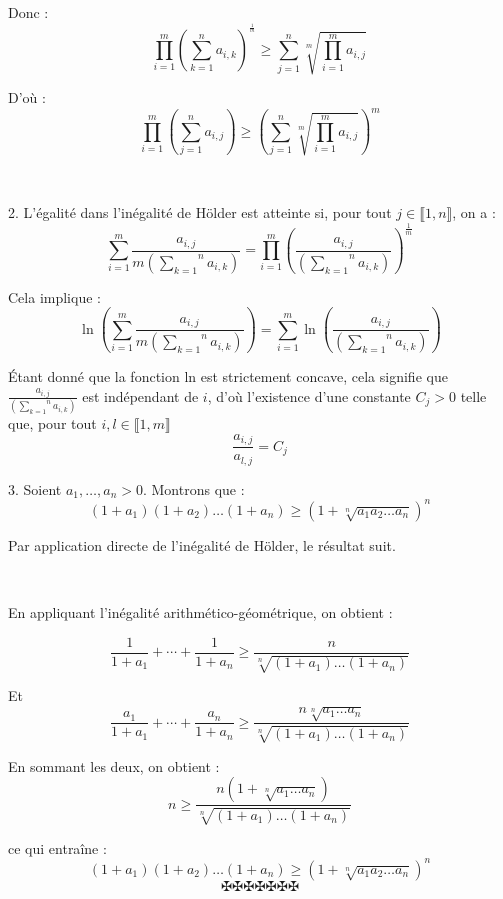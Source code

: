 Donc :
\[ \underset{i = 1}{\overset{}{} \overset{m}{\prod}} \left(
   \overset{n}{\underset{k = 1}{\sum}} a_{i, k} \right)^{^{\frac{1}{m}}}
   \geqslant \underset{j = 1}{\overset{n}{\sum}} \sqrt[m]{\underset{i =
   1}{\overset{m}{\prod}} a_{i, j}} \]


D'o{\`u} :
\[ \underset{i = 1}{\overset{m}{\prod}} \left( \overset{n}{\underset{j =
   1}{\sum}} a_{i, j} \right) \geqslant \left( \underset{j =
   1}{\overset{n}{\sum}} \sqrt[m]{\underset{i = 1}{\overset{m}{\prod}} a_{i,
   j}} \right)^m \]


\

2. L'{\'e}galit{\'e} dans l'in{\'e}galit{\'e} de H{\"o}lder est atteinte si,
pour tout $j \in \llbracket 1, n \rrbracket$, on a :
\[ \underset{i = 1}{\overset{}{} \overset{m}{\sum}} \frac{a_{i, j}}{m \left(
   \overset{n}{\underset{k = 1}{\sum}} a_{i, k} \right) } = \underset{i =
   1}{\overset{}{} \overset{m}{\prod}} \left( \frac{a_{i, j}}{\left(
   \overset{n}{\underset{k = 1}{\sum}} a_{i, k} \right) }
   \right)^{\frac{1}{m}} \]


Cela implique :
\[ \ln \left( \underset{i = 1}{\overset{}{} \overset{m}{\sum}} \frac{a_{i,
   j}}{m \left( \overset{n}{\underset{k = 1}{\sum}} a_{i, k} \right) } \right)
   = \underset{i = 1}{\overset{}{} \overset{m}{\sum}} \ln \left( \frac{a_{i,
   j}}{\left( \overset{n}{\underset{k = 1}{\sum}} a_{i, k} \right) } \right)
\]


{\'E}tant donn{\'e} que la fonction ln est strictement concave, cela signifie
que $\frac{a_{i, j}}{\left( \overset{n}{\underset{k = 1}{\sum}} a_{i, k}
\right) }$ est ind{\'e}pendant de $i$, d'o{\`u} l'existence d'une constante
$C_j > 0$ telle que, pour tout $i, l \in \llbracket 1, m \rrbracket$
\[ \frac{a_{i, j}}{a_{l, j}} = C_j \]


3. Soient $a_1, \ldots, a_n > 0$. Montrons que :
\[ (1 + a_1) (1 + a_2) \ldots (1 + a_n) \geqslant \left( 1 + \sqrt[n]{a_1 a_2
   \ldots a_n} \right)^n \]



Par application directe de l'in{\'e}galit{\'e} de H{\"o}lder, le r{\'e}sultat
suit.

\


En appliquant l'in{\'e}galit{\'e} arithm{\'e}tico-g{\'e}om{\'e}trique, on
obtient :


\[ \frac{1}{1 + a_1} + \cdots + \frac{1}{1 + a_n} \geqslant
   \frac{n}{\sqrt[n]{(1 + a_1) \ldots (1 + a_n)}} \]


Et
\[ \frac{a_1}{1 + a_1} + \cdots + \frac{a_n}{1 + a_n} \geqslant \frac{n
   \sqrt[n]{a_1 \ldots a_n}}{\sqrt[n]{(1 + a_1) \ldots (1 + a_n)}} \]


En sommant les deux, on obtient :
\[ n \geqslant \frac{n \left( 1 + \sqrt[n]{a_1 \ldots a_n}
   \right)}{\sqrt[n]{(1 + a_1) \ldots (1 + a_n)}} \]


ce qui entra{\^i}ne :
\[ (1 + a_1) (1 + a_2) \ldots (1 + a_n) \geqslant \left( 1 + \sqrt[n]{a_1 a_2
   \ldots a_n} \right)^n \]
\[ \maltese \maltese \maltese \maltese \maltese \maltese \maltese \]
